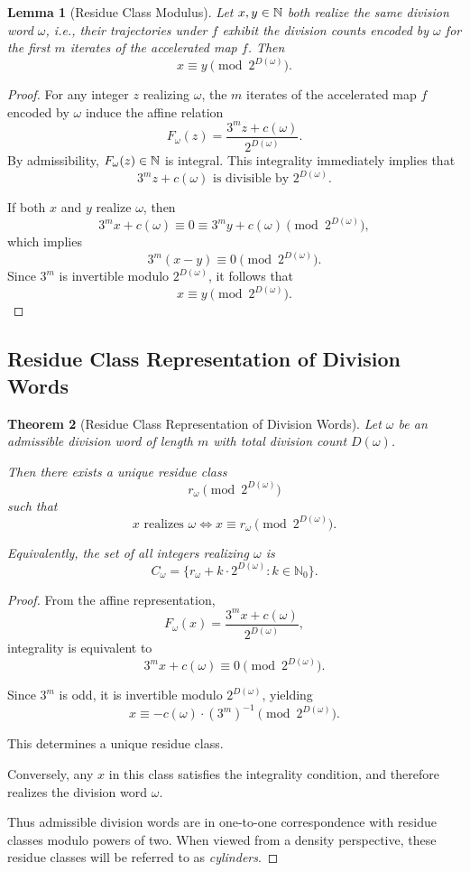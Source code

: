 \documentclass[12pt, oneside]{article}
\numberwithin{equation}{section}
\theoremstyle{definition}
\theoremstyle{plain}
\newtheorem{theorem}{Theorem}[section]
\newtheorem{lemma}[theorem]{Lemma}
\theoremstyle{remark}
\begin{document}
\begin{lemma}[Residue Class Modulus]
\label{lem:residue-modulus}
Let $x,y \in \mathbb{N}$ both realize the same division word $\omega$, i.e.,
their trajectories under $f$ exhibit the division counts encoded by $\omega$
for the first $m$ iterates of the accelerated map $f$. Then
\[
x \equiv y \pmod{2^{D(\omega)}}.
\]
\end{lemma}

\begin{proof}
For any integer $z$ realizing $\omega$, the $m$ iterates of the accelerated map
$f$ encoded by $\omega$ induce the affine relation
\[
F_\omega(z) = \frac{3^m z + c(\omega)}{2^{D(\omega)}}.
\]
By admissibility, $F_\omega(z)\in\mathbb{N}$ is integral. This integrality
immediately implies that
\[
3^m z + c(\omega) \text{ is divisible by } 2^{D(\omega)}.
\]

If both $x$ and $y$ realize $\omega$, then
\[
3^m x + c(\omega) \equiv 0 \equiv 3^m y + c(\omega) \pmod{2^{D(\omega)}},
\]
which implies
\[
3^m(x-y) \equiv 0 \pmod{2^{D(\omega)}}.
\]
Since $3^m$ is invertible modulo $2^{D(\omega)}$, it follows that
\[
x \equiv y \pmod{2^{D(\omega)}}.
\]
\end{proof}

\subsection{Residue Class Representation of Division Words}

\begin{theorem}[Residue Class Representation of Division Words]
\label{thm:cylinder}
Let $\omega$ be an admissible division word of length $m$ with total division count $D(\omega)$.

Then there exists a unique residue class
\[
r_\omega \pmod{2^{D(\omega)}}
\]
such that
\[
x \text{ realizes } \omega \iff x \equiv r_\omega \pmod{2^{D(\omega)}}.
\]

Equivalently, the set of all integers realizing $\omega$ is
\[
C_\omega = \{ r_\omega + k \cdot 2^{D(\omega)} : k \in \mathbb{N}_0 \}.
\]

\end{theorem}

\begin{proof}
From the affine representation,
\[
F_\omega(x) = \frac{3^m x + c(\omega)}{2^{D(\omega)}},
\]
integrality is equivalent to
\[
3^m x + c(\omega) \equiv 0 \pmod{2^{D(\omega)}}.
\]

Since $3^m$ is odd, it is invertible modulo $2^{D(\omega)}$, yielding
\[
x \equiv -c(\omega) \cdot (3^m)^{-1} \pmod{2^{D(\omega)}}.
\]

This determines a unique residue class.

Conversely, any $x$ in this class satisfies the integrality condition,
and therefore realizes the division word $\omega$.

Thus admissible division words are in one-to-one correspondence with residue
classes modulo powers of two. When viewed from a density perspective, these
residue classes will be referred to as \emph{cylinders}.
\end{proof}
\end{document}
